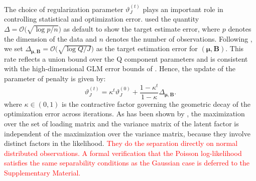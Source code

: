 \documentclass[]{report}
\theoremstyle{definition}
\begin{document}
The choice of regularization parameter $\vartheta_{J}^{(t)}$ plays an important role in controlling statistical and optimization error. \cite{yi2015regularizedemalgorithmsunified} used the quantity $\Delta=\mathcal{O}\bigl(\sqrt{\log p/n}\bigr)$ as default to show the target estimate error, where $p$ denotes the dimension of the data and $n$ denotes the number of observations. Following \cite{yi2015regularizedemalgorithmsunified}, we set $\Delta_{\bm{\mu},\mathbf{B}}=\mathcal{O}\bigl(\sqrt{\log Q/J}\bigr)$ as the target estimation error for $(\bm{\mu},\mathbf{B})$. This rate reflects a union bound over the Q component parameters and is consistent with the high-dimensional GLM error bounds of \cite{Negahban_2012}. Hence, the update of the parameter of penalty is given by:
\begin{equation}
    \vartheta_{J}^{(t)}=\kappa^{t}\vartheta_{J}^{(0)}+\dfrac{1-\kappa^{t}}{1-\kappa}\Delta_{\bm{\mu},\mathbf{B}}.
\end{equation}
where $\kappa\in (0,1)$ is the contractive factor governing the geometric decay of the optimization error across iterations.
As has been shown by \cite{article}, the maximization over the set of loading matrix and the variance matrix of the latent factor is independent of the maximization over the variance matrix, because they involve distinct factors in the likelihood. \textcolor{red}{They do the separation directly on normal distributed observations. A formal verification that the Poisson log-likelihood satisfies the same separability conditions as the Gaussian case is deferred to the Supplementary Material.}
\end{document}
